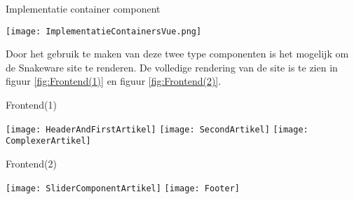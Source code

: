 \newpage

\whitespace
\begin{graphic}
    \captionsetup{type=figure}
    \caption{Implementatie container component}
    \texttt{[image: ImplementatieContainersVue.png]}
    \label{fig:FrontendContainerImplementatie}
\end{graphic}

\whitespace
Door het gebruik te maken van deze twee type componenten is het mogelijk om de Snakeware site te renderen.
De volledige rendering van de site is te zien in figuur \ref{fig:Frontend(1)} en figuur \ref{fig:Frontend(2)}.

\newpage
\begin{graphic}
    \captionsetup{type=figure}
    \caption{Frontend(1)}
    \texttt{[image: HeaderAndFirstArtikel]}
    \texttt{[image: SecondArtikel]}
    \texttt{[image: ComplexerArtikel]}
    \label{fig:Frontend(1)}
\end{graphic}

\newpage
\begin{graphic}
    \captionsetup{type=figure}
    \caption{Frontend(2)}
    \texttt{[image: SliderComponentArtikel]}
    \texttt{[image: Footer]}
    \label{fig:Frontend(2)}
\end{graphic}
%
%
%
